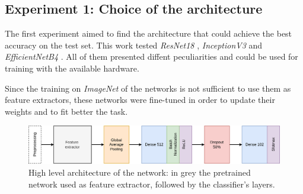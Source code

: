 \subsection{Experiment 1: Choice of the architecture}\label{sec:exp1}
The first experiment aimed to find the architecture that could achieve the best accuracy on the test set. This work tested \textit{ResNet18} \cite{he2015deep}, \textit{InceptionV3} \cite{szegedy2015going} and 
\textit{EfficientNetB4} \cite{tan2019efficientnet}. All of them presented diffent peculiarities and could be used for training with the available hardware. \par
Since the training on \textit{ImageNet} of the networks is not sufficient to use them as feature extractors, these networks were fine-tuned in order to update their weights and to fit better the task.\par
\begin{figure}[ht!]
\centering
\includegraphics[width=1\textwidth]{images/architecture.png} 
\caption{High level architecture of the network: in grey the pretrained network used as feature extractor, followed by the classifier's layers.}
\label{fig:architecture}
\end{figure}




